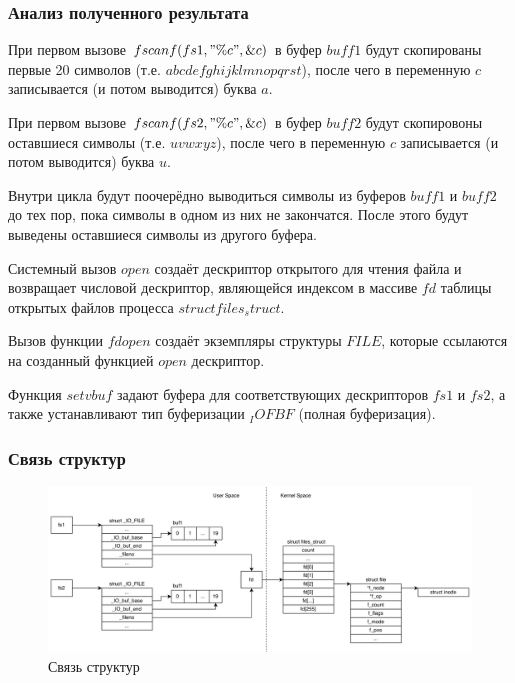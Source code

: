 \subsubsection*{Анализ полученного результата}

При первом вызове $fscanf(fs1, "\%c", \&c)$ в буфер $buff1$ будут скопированы первые 20 символов (т.е. $abcdefghijklmnopqrst$), после чего в переменную $c$ записывается (и потом выводится) буква $a$. 

При первом вызове $fscanf(fs2, "\%c", \&c)$ в буфер $buff2$ будут скопировоны оставшиеся символы (т.е. $uvwxyz$), после чего в переменную $c$ записывается (и потом выводится) буква $u$.

Внутри цикла будут поочерёдно выводиться символы из буферов $buff1$ и $buff2$ до тех пор, пока символы в одном из них не закончатся.
После этого будут выведены оставшиеся символы из другого буфера.

Системный вызов $open$ создаёт дескриптор открытого для чтения файла и возвращает числовой дескриптор, являющейся индексом в массиве $fd$ таблицы открытых файлов процесса $struct files_struct$. 

Вызов функции $fdopen$ создаёт экземпляры структуры $FILE$, которые ссылаются на созданный функцией $open$ дескриптор.

Функция $setvbuf$ задают буфера для соответствующих дескрипторов $fs1$ и $fs2$, а также устанавливают тип буферизации $_IOFBF$ (полная буферизация).

\subsubsection*{Связь структур}


\begin{figure}[h]
	\centering
	\captionsetup{justification=centering}
	\includegraphics[width=160mm]{img/prog1_diagram.png}
	\caption{Связь структур}
	\label{fig:prog-1-diagram}
\end{figure}

